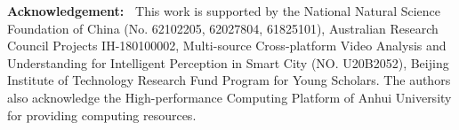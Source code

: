 \documentclass[journal]{IEEEtran}
\begin{document}
\noindent \textbf{Acknowledgement:~} This work is supported by the National Natural Science Foundation of China (No. 62102205, 62027804, 61825101), Australian Research Council Projects IH-180100002, Multi-source Cross-platform Video Analysis and Understanding for Intelligent Perception in Smart City (NO. U20B2052), Beijing Institute of Technology Research Fund Program for Young Scholars. The authors also acknowledge the High-performance Computing Platform of Anhui University for providing computing resources. 



 


{


}
\end{document}
